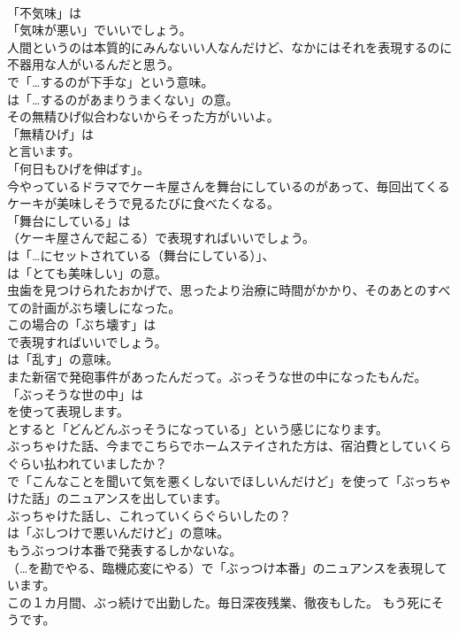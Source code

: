 \documentclass[8pt]{extreport}
\begin{document}
\begin{CJK}{UTF8}{min}
\\	「不気味」は
\\	「気味が悪い」でいいでしょう。	
\\	人間というのは本質的にみんないい人なんだけど、なかにはそれを表現するのに不器用な人がいるんだと思う。 
\\	で「…するのが下手な」という意味。
\\	は「…するのがあまりうまくない」の意。	
\\	その無精ひげ似合わないからそった方がいいよ。 
\\	「無精ひげ」は
\\	と言います。
\\	「何日もひげを伸ばす」。	
\\	今やっているドラマでケーキ屋さんを舞台にしているのがあって、毎回出てくるケーキが美味しそうで見るたびに食べたくなる。 
\\	「舞台にしている」は 
\\	（ケーキ屋さんで起こる）で表現すればいいでしょう。
\\	は「…にセットされている（舞台にしている）」、
\\	は「とても美味しい」の意。	
\\	虫歯を見つけられたおかげで、思ったより治療に時間がかかり、そのあとのすべての計画がぶち壊しになった。 
\\	この場合の「ぶち壊す」は 
\\	で表現すればいいでしょう。
\\	は「乱す」の意味。	
\\	また新宿で発砲事件があったんだって。ぶっそうな世の中になったもんだ。 
\\	「ぶっそうな世の中」は
\\	を使って表現します。
\\	とすると「どんどんぶっそうになっている」という感じになります。	
\\	ぶっちゃけた話、今までこちらでホームステイされた方は、宿泊費としていくらぐらい払われていましたか？ 
\\	で「こんなことを聞いて気を悪くしないでほしいんだけど」を使って「ぶっちゃけた話」のニュアンスを出しています。	
\\	ぶっちゃけた話し、これっていくらぐらいしたの？ 
\\	は「ぶしつけで悪いんだけど」の意味。	
\\	もうぶっつけ本番で発表するしかないな。 
\\	（…を勘でやる、臨機応変にやる）で「ぶっつけ本番」のニュアンスを表現しています。	
\\	この１カ月間、ぶっ続けで出勤した。毎日深夜残業、徹夜もした。 もう死にそうです。 

\end{CJK}
\end{document}
